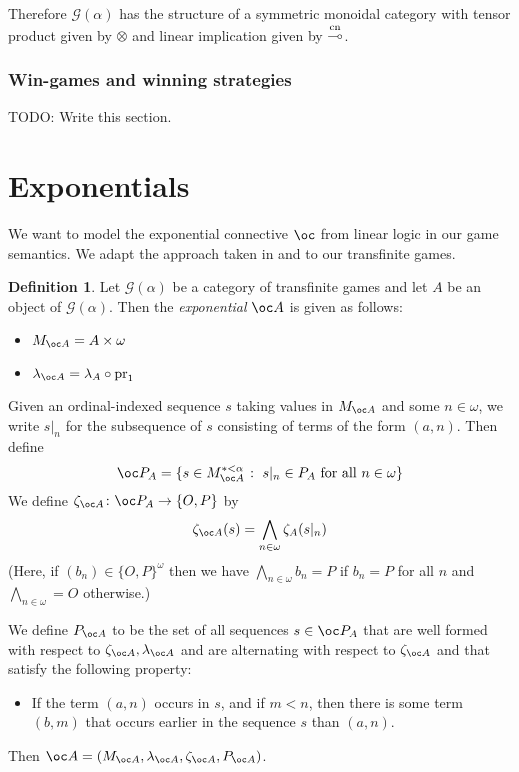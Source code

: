 \documentclass[11pt]{article} %
\theoremstyle{plain} %
\theoremstyle{definition} %
\newtheorem{definition}[theorem]{Definition}
\theoremstyle{note}
\theoremstyle{exercisestyle}
\newcommand*\from{\colon}
\DeclareMathOperator{\pr}{pr}
\newcommand{\tensor}{\otimes}
\renewcommand{\implies}{\multimap}
\newcommand{\G}{\mathcal G}
\newcommand{\suchthat}{\;\colon\;}
\newcommand{\OP}{\{O,P\}}
\DeclareMathOperator{\cn}{cn}
\newcommand{\impliescn}{\protect\overset{\cn}{\implies}}
\begin{document}
Therefore $\G(\alpha)$ has the structure of a symmetric monoidal category with tensor product given by $\tensor$ and linear implication given by $\impliescn$.  

\subsubsection{Win-games and winning strategies}

TODO: Write this section.

\section{Exponentials}

We want to model the exponential connective $\oc$ from linear logic in our game semantics.  We adapt the approach taken in \cite{laird02} and \cite{martinsthesis} to our transfinite games.

\begin{definition}
  Let $\G(\alpha)$ be a category of transfinite games and let $A$ be an object of $\G(\alpha)$.  Then the \emph{exponential} $\oc A$ is given as follows:
  \begin{itemize}
    \item $M_{\oc A} = A\times\omega$
    \item $\lambda_{\oc A} = \lambda_A\circ\pr_1$
  \end{itemize}

  Given an ordinal-indexed sequence $s$ taking values in $M_{\oc A}$ and some $n\in\omega$, we write $s\vert_n$ for the subsequence of $s$ consisting of terms of the form $(a,n)$.  Then define
  \[
    \oc P_A = \{s\in M_{\oc A}^{*<\alpha}\suchthat s\vert_n\in P_A\textrm{ for all }n\in \omega\}
    \]
  We define $\zeta_{\oc A}\from \oc P_A\to \OP$ by
  \[
    \zeta_{\oc A}(s) = \bigwedge_{n\in \omega} \zeta_A(s\vert_n)
    \]
  (Here, if $(b_n)\in\OP^\omega$ then we have $\bigwedge_{n\in\omega} b_n = P$ if $b_n=P$ for all $n$ and $\bigwedge_{n\in\omega}=O$ otherwise.)

  We define $P_{\oc A}$ to be the set of all sequences $s\in\oc P_A$ that are well formed with respect to $\zeta_{\oc A},\lambda_{\oc A}$ and are alternating with respect to $\zeta_{\oc A}$ and that satisfy the following property:
  
  \begin{itemize}
    \item If the term $(a,n)$ occurs in $s$, and if $m<n$, then there is some term $(b,m)$ that occurs earlier in the sequence $s$ than $(a,n)$.  
  \end{itemize}

  Then $\oc A=(M_{\oc A},\lambda_{\oc A},\zeta_{\oc A},P_{\oc A})$.  
\end{definition}
\end{document}
